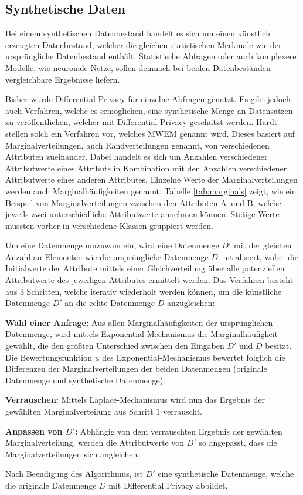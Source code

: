 \subsection{Synthetische Daten}\label{sec:synthetic_data}

Bei einem synthetischen Datenbestand handelt es sich um einen künstlich erzeugten Datenbestand, welcher die gleichen statistischen Merkmale wie der ursprüngliche Datenbestand enthält.
Statistische Abfragen oder auch komplexere Modelle, wie neuronale Netze, sollen demnach bei beiden Datenbeständen vergleichbare Ergebnisse liefern.

Bisher wurde Differential Privacy für einzelne Abfragen genutzt.
Es gibt jedoch auch Verfahren, welche es ermöglichen, eine synthetische Menge an Datensätzen zu veröffentlichen, welcher mit Differential Privacy geschützt werden.
Hardt \etal \cite{P-90} stellen solch ein Verfahren vor, welches MWEM genannt wird.
Dieses basiert auf Marginalverteilungen, auch Randverteilungen genannt, von verschiedenen Attributen zueinander.
Dabei handelt es sich um Anzahlen verschiedener Attributwerte eines Attributs in Kombination mit den Anzahlen verschiedener Attributwerte eines anderen Attributes.
Einzelne Werte der Marginalverteilungen werden auch Marginalhäufigkeiten genannt.
Tabelle \ref{tab:marginals} zeigt, wie ein Beispiel von Marginalverteilungen zwischen den Attributen \dq A\dq\ und \dq B\dq, welche jeweils zwei unterschiedliche Attributwerte annehmen können.
Stetige Werte müssten vorher in verschiedene Klassen gruppiert werden.



Um eine Datenmenge umzuwandeln, wird eine Datenmenge $D'$ mit der gleichen Anzahl an Elementen wie die ursprüngliche Datenmenge $D$ initialisiert, wobei die Initialwerte der Attribute mittels einer Gleichverteilung über alle potenziellen Attributwerte des jeweiligen Attributes ermittelt werden.
Das Verfahren besteht aus 3 Schritten, welche iterativ wiederholt werden können, um die künstliche Datenmenge $D'$ an die echte Datenmenge $D$ anzugleichen:
\begin{compactenum}
    \item \textbf{Wahl einer Anfrage:} Aus allen Marginalhäufigkeiten der ursprünglichen Datenmenge, wird mittels Exponential-Mechanismus die Marginalhäufigkeit gewählt, die den größten Unterschied zwischen den Eingaben $D'$ und $D$ besitzt.
    Die Bewertungsfunktion $u$ des Exponential-Mechanismus bewertet folglich die Differenzen der Marginalverteilungen der beiden Datenmengen (originale Datenmenge und synthetische Datenmenge).
    \item \textbf{Verrauschen:} Mittels Laplace-Mechanismus wird nun das Ergebnis der gewählten Marginalverteilung aus Schritt 1 verrauscht.
    \item \textbf{Anpassen von $D'$:} Abhängig von dem verrauschten Ergebnis der gewählten Marginalverteilung, werden die Attributwerte von $D'$ so angepasst, dass die Marginalverteilungen sich angleichen.
\end{compactenum}
Nach Beendigung des Algorithmus, ist $D'$ eine synthetische Datenmenge, welche die originale Datenmenge $D$ mit Differential Privacy abbildet.

